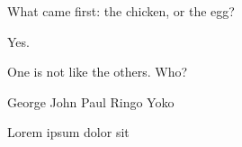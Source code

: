 \documentclass[english]{hogent-exam}
\begin{document}
\maketitle





\begin{questions}

\framedsolutions
\ifsolution
  \printanswers
\else
  \noprintanswers
  \newpage
\fi


\question[10] What came first: the chicken, or the egg?

\begin{solutionordottedlines}[2cm]
  Yes.
\end{solutionordottedlines}

\question[1] One is not like the others. Who?

\begin{oneparcheckboxes}
  \choice George
  \choice John
  \choice Paul
  \choice Ringo
  \CorrectChoice Yoko
\end{oneparcheckboxes}

\question[1] Lorem ipsum dolor sit \fillin[amet][5cm]

\end{questions}

\scratchnotes
\end{document}
